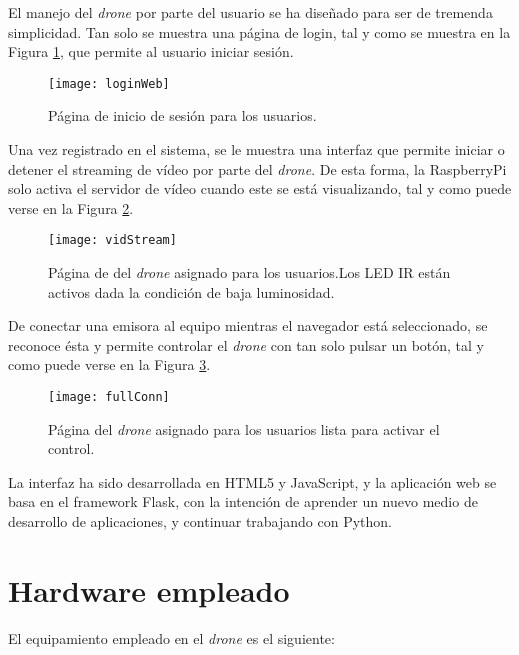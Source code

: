 El manejo del \emph{drone} por parte del usuario se ha diseñado para ser de tremenda simplicidad. 
Tan solo se muestra una página de login, tal y como se muestra en la Figura \ref{fig:login}, que permite al usuario iniciar sesión. 

\begin{figure}
	\centering
	\texttt{[image: loginWeb]}
	\caption[Página de Login]{Página de inicio de sesión para los usuarios.}\label{fig:login}
\end{figure}

Una vez registrado en el sistema, se le muestra una interfaz que permite iniciar o detener el streaming de vídeo por parte del \emph{drone}. De esta forma, la RaspberryPi solo activa el servidor de vídeo cuando este se está visualizando, tal y como puede verse en la Figura \ref{fig:vidStream}. 
\begin{figure}
	\centering
	\texttt{[image: vidStream]}
	\caption[Página de control]{Página de del \emph{drone} asignado para los usuarios.Los LED IR están activos dada la condición de baja luminosidad.}\label{fig:vidStream}
\end{figure}

De conectar una emisora al equipo mientras el navegador está seleccionado, se reconoce ésta y permite controlar el \emph{drone} con tan solo pulsar un botón, tal y como puede verse en la Figura \ref{fig:fullConn}.

\begin{figure}
	\centering
	\texttt{[image: fullConn]}
	\caption[Página de control y emisora]{Página del \emph{drone} asignado para los usuarios lista para activar el control.}\label{fig:fullConn}
\end{figure}

La interfaz ha sido desarrollada en HTML5 y JavaScript, y la aplicación web se basa en el framework Flask, con la intención de aprender un nuevo medio de desarrollo de aplicaciones, y continuar trabajando con Python. 



\section{Hardware empleado}

El equipamiento empleado en el \emph{drone} es el siguiente: 

